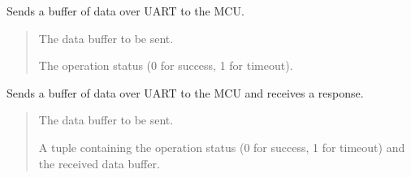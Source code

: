 \documentclass[letterpaper,10pt,english]{sphinxmanual}
\begin{document}
\begin{fulllineitems}
\begin{fulllineitems}
\begin{quote}
\begin{description}
\end{description}\end{quote}

\end{fulllineitems}


\begin{fulllineitems}
\label{\detokenize{cplddocs:management_mcu_uart.MngMcuUart.uart_send_buffer}}
\pysigstartsignatures
{}
\pysigstopsignatures
\sphinxAtStartPar
Sends a buffer of data over UART to the MCU.
\begin{quote}\begin{description}
\sphinxAtStartPar
{} \textendash{} The data buffer to be sent.

\sphinxAtStartPar
The operation status (0 for success, 1 for timeout).

\end{description}\end{quote}

\end{fulllineitems}


\begin{fulllineitems}
\label{\detokenize{cplddocs:management_mcu_uart.MngMcuUart.uart_send_buffer_wrx}}
\pysigstartsignatures
{}
\pysigstopsignatures
\sphinxAtStartPar
Sends a buffer of data over UART to the MCU and receives a response.
\begin{quote}\begin{description}
\sphinxAtStartPar
{} \textendash{} The data buffer to be sent.

\sphinxAtStartPar
A tuple containing the operation status (0 for success, 1 for timeout)
and the received data buffer.

\end{description}\end{quote}


\end{fulllineitems}
\end{fulllineitems}
\end{document}
